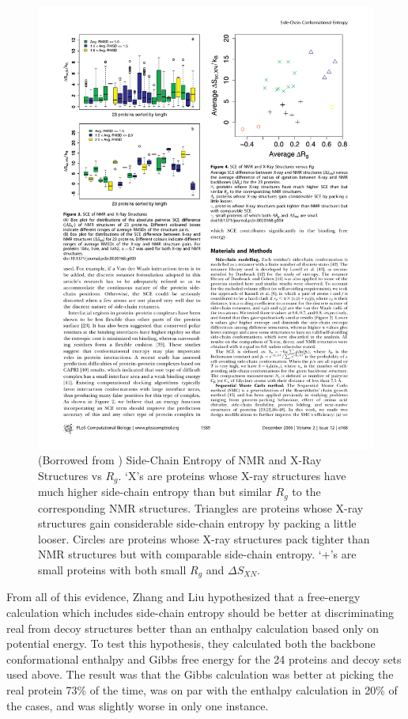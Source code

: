 \begin{figure}[h]
	\center
	\includegraphics{deltaS_discrimination}
	\caption{(Borrowed from \cite{Zhang:2006p11}) Side-Chain Entropy of NMR and X-Ray Structures vs $R_g$. `X's are proteins whose X-ray structures have much higher side-chain entropy than but similar $R_g$ to the corresponding NMR structures. Triangles are proteins whose X-ray structures gain considerable side-chain entropy by packing a little looser. Circles are proteins whose X-ray structures pack tighter than NMR structures but with comparable side-chain entropy. `+'s are small proteins with both small $R_g$ and $\Delta S_{XN}$.}
	\label{fig:deltaS_discrimination}
\end{figure}

From all of this evidence, Zhang and Liu hypothesized that a free-energy calculation which includes side-chain entropy should be better at discriminating real from decoy structures better than an enthalpy calculation based only on potential energy. To test this hypothesis, they calculated both the backbone conformational enthalpy and Gibbs free energy for the 24 proteins and decoy sets used above. The result was that the Gibbs calculation was better at picking the real protein 73\% of the time, was on par with the enthalpy calculation in 20\% of the cases, and was slightly worse in only one instance.

